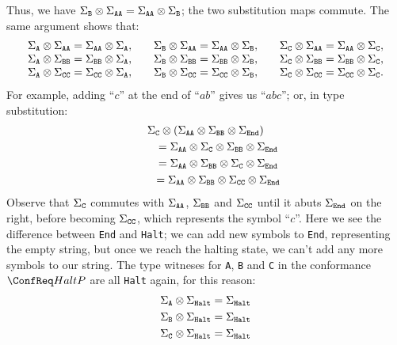 \documentclass[../generics]{subfiles}
\begin{document}
Thus, we have $\Sigma_{\texttt{B}}\otimes\Sigma_{\texttt{AA}} = \Sigma_{\texttt{AA}}\otimes\Sigma_{\texttt{B}}$; the two substitution maps commute. The same argument shows that:
\[
\begin{array}{lllll}
\Sigma_{\texttt{A}}\otimes\Sigma_{\texttt{AA}}=\Sigma_{\texttt{AA}}\otimes\Sigma_{\texttt{A}},&&\Sigma_{\texttt{B}}\otimes\Sigma_{\texttt{AA}}=\Sigma_{\texttt{AA}}\otimes\Sigma_{\texttt{B}},&&\Sigma_{\texttt{C}}\otimes\Sigma_{\texttt{AA}}=\Sigma_{\texttt{AA}}\otimes\Sigma_{\texttt{C}},\\
\Sigma_{\texttt{A}}\otimes\Sigma_{\texttt{BB}}=\Sigma_{\texttt{BB}}\otimes\Sigma_{\texttt{A}},&&\Sigma_{\texttt{B}}\otimes\Sigma_{\texttt{BB}}=\Sigma_{\texttt{BB}}\otimes\Sigma_{\texttt{B}},&&\Sigma_{\texttt{C}}\otimes\Sigma_{\texttt{BB}}=\Sigma_{\texttt{BB}}\otimes\Sigma_{\texttt{C}},\\
\Sigma_{\texttt{A}}\otimes\Sigma_{\texttt{CC}}=\Sigma_{\texttt{CC}}\otimes\Sigma_{\texttt{A}},&&\Sigma_{\texttt{B}}\otimes\Sigma_{\texttt{CC}}=\Sigma_{\texttt{CC}}\otimes\Sigma_{\texttt{B}},&&\Sigma_{\texttt{C}}\otimes\Sigma_{\texttt{CC}}=\Sigma_{\texttt{CC}}\otimes\Sigma_{\texttt{C}}.\\
\end{array}
\]
For example, adding ``$c$'' at the end of ``$ab$'' gives us ``$abc$''; or, in type substitution:
\begin{gather*}
\Sigma_{\texttt{C}}\otimes\left(\Sigma_{\texttt{AA}}\otimes\Sigma_{\texttt{BB}}\otimes\Sigma_{\texttt{End}}\right)\\
\qquad {} = \Sigma_{\texttt{AA}}\otimes\Sigma_{\texttt{C}}\otimes\Sigma_{\texttt{BB}}\otimes\Sigma_{\texttt{End}}\\
\qquad {} = \Sigma_{\texttt{AA}}\otimes\Sigma_{\texttt{BB}}\otimes\Sigma_{\texttt{C}}\otimes\Sigma_{\texttt{End}}\\
\qquad {} = \Sigma_{\texttt{AA}}\otimes\Sigma_{\texttt{BB}}\otimes\Sigma_{\texttt{CC}}\otimes\Sigma_{\texttt{End}}
\end{gather*}
Observe that $\Sigma_{\texttt{C}}$ commutes with $\Sigma_{\texttt{AA}}$, $\Sigma_{\texttt{BB}}$ and $\Sigma_{\texttt{CC}}$ until it abuts $\Sigma_{\texttt{End}}$ on the right, before becoming $\Sigma_{\texttt{CC}}$, which represents the symbol ``$c$''. Here we see the difference between \texttt{End} and \texttt{Halt}; we can add new symbols to \texttt{End}, representing the empty string, but once we reach the halting state, we can't add any more symbols to our string. The type witneses for \texttt{A}, \texttt{B} and \texttt{C} in the conformance $\ConfHaltP$ are all \texttt{Halt} again, for this reason:
\begin{gather*}
\Sigma_{\texttt{A}}\otimes\Sigma_{\texttt{Halt}}=\Sigma_{\texttt{Halt}}\\
\Sigma_{\texttt{B}}\otimes\Sigma_{\texttt{Halt}}=\Sigma_{\texttt{Halt}}\\
\Sigma_{\texttt{C}}\otimes\Sigma_{\texttt{Halt}}=\Sigma_{\texttt{Halt}}
\end{gather*}
\end{document}
